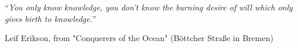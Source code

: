 \vspace*{0.2\textheight}

\noindent\enquote{\itshape You only know knowledge, you don't know the burning desire of will which only gives birth to knowledge.}\bigbreak

\hfill Leif Erikson, from "Conquerers of the Ocean" (Böttcher Straße in Bremen)